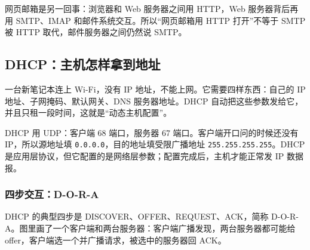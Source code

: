 网页邮箱是另一回事：浏览器和 Web 服务器之间用 HTTP，Web 服务器背后再用 SMTP、IMAP 和邮件系统交互。所以“网页邮箱用 HTTP 打开”不等于 SMTP 被 HTTP 取代，邮件服务器之间仍然说 SMTP。

\subsection{DHCP：主机怎样拿到地址}

一台新笔记本连上 Wi-Fi，没有 IP 地址，不能上网。它需要四样东西：自己的 IP 地址、子网掩码、默认网关、DNS 服务器地址。DHCP 自动把这些参数发给它，并且只租一段时间，这就是“动态主机配置”。

DHCP 用 UDP：客户端 68 端口，服务器 67 端口。客户端开口问的时候还没有 IP，所以源地址填 \texttt{0.0.0.0}，目的地址填受限广播地址 \texttt{255.255.255.255}。DHCP 是应用层协议，但它配置的是网络层参数；配置完成后，主机才能正常发 IP 数据报。

\subsubsection{四步交互：D-O-R-A}

DHCP 的典型四步是 DISCOVER、OFFER、REQUEST、ACK，简称 D-O-R-A。图里画了一个客户端和两台服务器：客户端广播发现，两台服务器都可能给 offer，客户端选一个并广播请求，被选中的服务器回 ACK。

